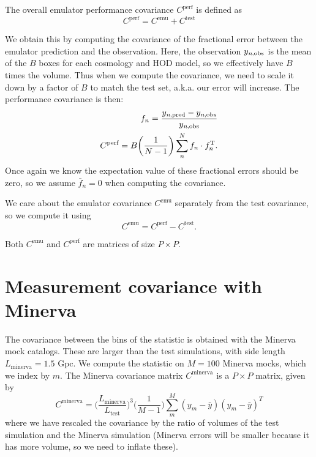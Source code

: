 \documentclass[12pt]{article}
\newcommand{\T}{^{\mathrm{T}}}
\newcommand{\cov}[1]{C^\text{#1}}
\newcommand{\y}[1]{y_{\text{#1}}}
\begin{document}
The overall emulator performance covariance $\cov{perf}$ is defined as
\begin{equation}
    \cov{perf} = \cov{emu} + \cov{test}
\end{equation}

We obtain this by computing the covariance of the fractional error between the emulator prediction and the observation.
Here, the observation $\y{\textit{n},obs}$ is the mean of the $B$ boxes for each cosmology and HOD model, so we effectively have $B$ times the volume.
Thus when we compute the covariance, we need to scale it down by a factor of $B$ to match the test set, a.k.a. our error will increase.
The performance covariance is then:
\begin{eqnarray}
    f_n = \frac{ \y{\textit{n},pred} - \y{\textit{n},obs} }{ \y{\textit{n},obs} } \\
    \cov{perf} =  B \bigg( \frac{1}{N-1} \bigg) \sum_n^N f_n \cdot f_n\T.
\end{eqnarray}
Once again we know the expectation value of these fractional errors should be zero, so we assume $\bar{f}_{n}=0$ when computing the covariance.

We care about the emulator covariance $\cov{emu}$ separately from the test covariance, so we compute it using
\begin{equation}
    \cov{emu} = \cov{perf} - \cov{test}.
\end{equation}

Both $\cov{emu}$ and $\cov{perf}$ are matrices of size $P \times P$.

\section{Measurement covariance with Minerva}

The covariance between the bins of the statistic is obtained with the Minerva mock catalogs. 
These are larger than the test simulations, with side length $L_\text{minerva}=1.5$ Gpc.
We compute the statistic on $M=100$ Minerva mocks, which we index by $m$.
The Minerva covariance matrix $\cov{minerva}$ is a $P \times P$ matrix, given by
\begin{equation}
\cov{minerva} = \bigg( \frac{L_\text{minerva}}{L_\text{test}} \bigg)^3 \bigg( \frac{1}{M-1} \bigg) \sum_m^M (y_{m} - \bar{y})(y_{m} - \bar{y})^T
\end{equation}
where we have rescaled the covariance by the ratio of volumes of the test simulation and the Minerva simulation (Minerva errors will be smaller because it has more volume, so we need to inflate these).
\end{document}
